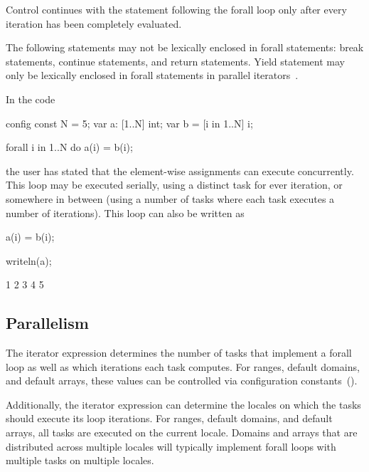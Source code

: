Control continues with the statement following the forall loop only
after every iteration has been completely evaluated.

The following statements may not be lexically enclosed in forall
statements: break statements, continue statements, and return
statements.  Yield statement may only be lexically enclosed in forall
statements in parallel iterators~.

\begin{example}
In the code
\begin{chapelpre}
config const N = 5;
var a: [1..N] int;
var b = [i in 1..N] i;
\end{chapelpre}
\begin{chapel}
forall i in 1..N do
  a(i) = b(i);
\end{chapel}
the user has stated that the element-wise assignments can execute
concurrently.  This loop may be executed serially, using a distinct
task for ever iteration, or somewhere in between (using a number of
tasks where each task executes a number of iterations).  This loop can
also be written as
\begin{chapel}
[i in 1..N] a(i) = b(i);
\end{chapel}
\begin{chapelpost}
writeln(a);
\end{chapelpost}
\begin{chapeloutput}
1 2 3 4 5
\end{chapeloutput}
\end{example}

\subsection{Parallelism}
\label{forall_parallelism}

The iterator expression determines the number of tasks that implement
a forall loop as well as which iterations each task computes.  For
ranges, default domains, and default arrays, these values can be
controlled via configuration constants~().

Additionally, the iterator expression can determine the locales on
which the tasks should execute its loop iterations.  For ranges,
default domains, and default arrays, all tasks are executed on the
current locale.  Domains and arrays that are distributed across
multiple locales will typically implement forall loops with multiple
tasks on multiple locales.


